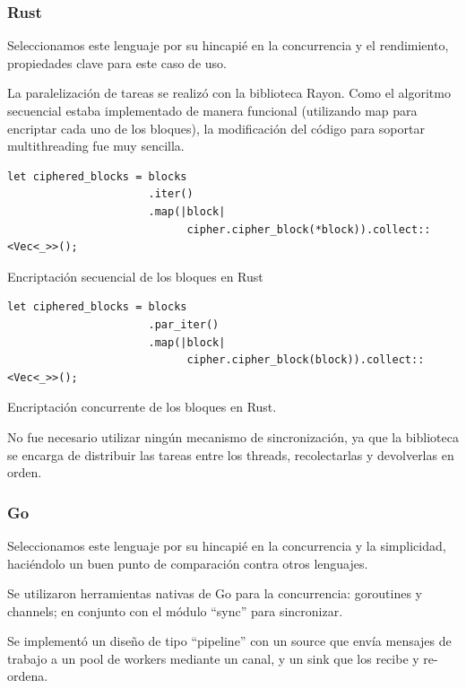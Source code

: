 \documentclass[11pt]{article}
\let\Oldsubsubsection\subsubsection
\renewcommand{\subsubsection}{\FloatBarrier\Oldsubsubsection}
\begin{document}
\subsubsection{Rust}

Seleccionamos este lenguaje por su hincapié en la concurrencia y el rendimiento, propiedades clave para este caso de uso.

La paralelización de tareas se realizó con la biblioteca Rayon. Como el algoritmo secuencial estaba implementado de manera funcional (utilizando map para encriptar cada uno de los bloques), la modificación del código para soportar multithreading fue muy sencilla.

\begin{listing}
\begin{verbatim}
let ciphered_blocks = blocks
                      .iter()
                      .map(|block|
                            cipher.cipher_block(*block)).collect::<Vec<_>>();
\end{verbatim}
\caption{Encriptación secuencial de los bloques en Rust}
\end{listing}

\begin{listing}
\begin{verbatim}
let ciphered_blocks = blocks
                      .par_iter()
                      .map(|block|
                            cipher.cipher_block(block)).collect::<Vec<_>>();
\end{verbatim}
\caption{Encriptación concurrente de los bloques en Rust.}
\end{listing}

No fue necesario utilizar ningún mecanismo de sincronización, ya que la biblioteca se encarga de distribuir las tareas entre los threads, recolectarlas y devolverlas en orden.

\subsubsection{Go}

Seleccionamos este lenguaje por su hincapié en la concurrencia y la simplicidad, haciéndolo un buen punto de comparación contra otros lenguajes.

Se utilizaron herramientas nativas de Go para la concurrencia: goroutines y channels; en conjunto con el módulo “sync” para sincronizar.

Se implementó un diseño de tipo “pipeline” con un source que envía mensajes de trabajo a un pool de workers mediante un canal, y un sink que los recibe y re-ordena.
\end{document}
